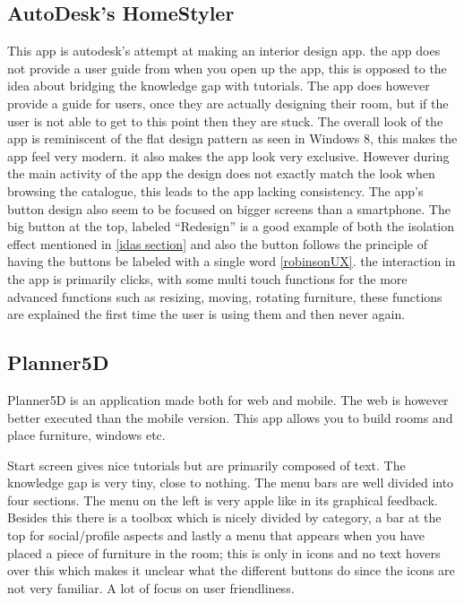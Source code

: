\subsection{AutoDesk’s HomeStyler}
This app is autodesk’s attempt at making an interior design app. the app does not provide a user  guide  from when 
you open up the app, this is opposed to the idea about bridging the knowledge gap with tutorials. The app does 
however provide a guide for users, once they are actually designing their room, but if the user is not able to get 
to this point then they are stuck. The overall look of the app is reminiscent of the flat design pattern as seen 
in Windows 8, this makes the app feel very modern. it also makes the app look very exclusive. However during the 
main activity of the app the design does not exactly match the look when browsing the catalogue, this leads to the 
app lacking consistency. The app’s button design also seem to be focused on bigger screens than a smartphone. The 
big button at the top, labeled “Redesign” is a good example of both the isolation effect mentioned in \ref{idas 
section} and also the button follows the principle of having the buttons be labeled with a single word 
\ref{robinsonUX}. the interaction in the app is primarily clicks, with some multi touch functions for the more 
advanced functions such as resizing, moving, rotating furniture, these functions are explained the first time the 
user is using them and then never again.

\subsection{Planner5D}

Planner5D is an application made both for web and mobile. The web is however better executed than the mobile version. This app allows you to build rooms and place furniture, windows etc. 

Start screen gives nice tutorials but are primarily composed of text. The knowledge gap is very tiny, close to nothing.
The menu bars are well divided into four sections.
The menu on the left is very apple like in its graphical feedback. Besides this there is a toolbox which is nicely divided by category, a bar at the top for social/profile aspects and lastly a menu that appears when you have placed a piece of furniture in the room; this is only in icons and no text hovers over this which makes it unclear what the different buttons do since the icons are not very familiar. A lot of focus on user friendliness. 


